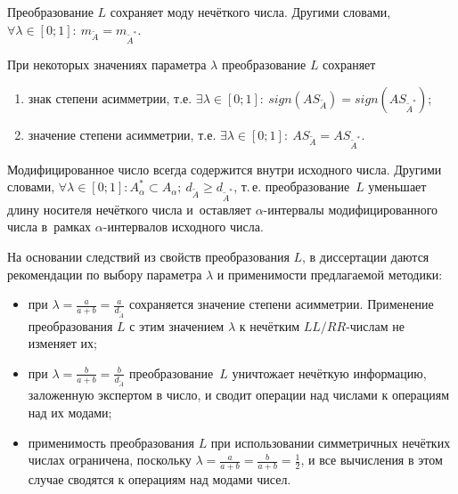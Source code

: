 \begin{prop}
\label{prop:L-prop1}
Преобразование $L$ сохраняет моду нечёткого числа. Другими словами, $\forall \lambda \in \left[ 0;1 \right]:\ m_{\tilde A}=m_{\tilde A^{*}}$.
\end{prop}

\begin{prop}
\label{prop:L-prop2}
При некоторых значениях параметра $\lambda$ преобразование $L$ сохраняет
\begin{enumerate}
  \item знак степени асимметрии, т.е. $\exists \lambda \in [0;1]:\ sign(AS_{\tilde A})=sign(AS_{\tilde A^{*}})$;
  \item значение степени асимметрии, т.е. $\exists \lambda \in [0;1]:\ AS_{\tilde A}=AS_{\tilde A^{*}}$.
\end{enumerate}
\end{prop}

\begin{prop}
\label{prop:L-prop3}
Модифицированное число всегда содержится внутри исходного числа. Другими словами, $\forall \lambda \in \left[ 0;1 \right]: A_{\alpha}^{*}\subset A_\alpha;\ d_{\tilde A} \geqslant d_{\tilde A^{*}}$, т.\,е. преобразование~$L$ уменьшает длину носителя нечёткого числа и~оставляет $\alpha$-интервалы модифицированного числа в~рамках $\alpha$-интервалов исходного числа.
\end{prop}

На основании следствий из свойств преобразования $L$, в диссертации даются рекомендации по выбору параметра $\lambda$ и применимости предлагаемой методики:
\begin{itemize}
  \item при $\displaystyle \lambda =\frac{a}{a+b}=\frac{a}{d_{\tilde A}}$ сохраняется значение степени асимметрии. Применение преобразования $L$ с этим значением $\lambda$ к нечётким $LL/RR$-числам не изменяет их;
  \item при $\displaystyle \lambda =\frac{b}{a+b}=\frac{b}{d_{\tilde A}}$ преобразование~$L$ уничтожает нечёткую информацию, заложенную экспертом в число, и сводит операции над числами к операциям над их модами;
  \item применимость преобразования $L$ при использовании симметричных нечётких числах ограничена, поскольку $\displaystyle \lambda =\frac{a}{a+b}=\frac{b}{a+b}=\frac{1}{2}$, и все вычисления в этом случае сводятся к операциям над модами чисел. 
\end{itemize}

